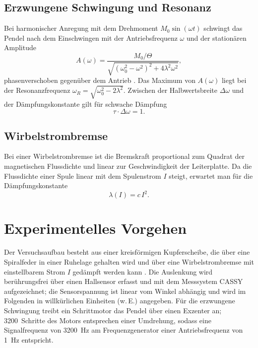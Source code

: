 \documentclass[11pt,a4paper]{article}
\begin{document}
\subsection{Erzwungene Schwingung und Resonanz}
Bei harmonischer Anregung mit dem Drehmoment $M_0\sin(\omega t)$
schwingt das Pendel nach dem Einschwingen mit der Antriebsfrequenz
$\omega$ und der stationären Amplitude
\begin{equation}
  A(\omega) = \frac{M_0/\Theta}
    {\sqrt{(\omega_0^2-\omega^2)^2 + 4\lambda^2\omega^2}},
  \label{eq:resonanz}
\end{equation}
phasenverschoben gegenüber dem Antrieb
\cite{Anleitung,Demtroeder}. Das Maximum von $A(\omega)$ liegt bei
der Resonanzfrequenz $\omega_R=\sqrt{\omega_0^2-2\lambda^2}$.
Zwischen der Halbwertsbreite $\Delta\omega$ und der
Dämpfungskonstante gilt für schwache Dämpfung
\begin{equation}
  \tau\cdot\Delta\omega = 1.
  \label{eq:tau_delta}
\end{equation}

\subsection{Wirbelstrombremse}
Bei einer Wirbelstrombremse ist die Bremskraft proportional zum
Quadrat der magnetischen Flussdichte und linear zur Geschwindigkeit
der Leiterplatte. Da die Flussdichte einer Spule linear mit dem
Spulenstrom $I$ steigt, erwartet man für die Dämpfungskonstante
\begin{equation}
  \lambda(I) = c\,I^2.
  \label{eq:lambda_I}
\end{equation}

\section{Experimentelles Vorgehen}
Der Versuchsaufbau besteht aus einer kreisförmigen Kupferscheibe,
die über eine Spiralfeder in einer Ruhelage gehalten wird und über
eine Wirbelstrombremse mit einstellbarem Strom $I$ gedämpft werden
kann \cite{Anleitung}. Die Auslenkung wird berührungsfrei über einen
Hallsensor erfasst und mit dem Messsystem CASSY aufgezeichnet; die
Sensorspannung ist linear vom Winkel abhängig und wird im Folgenden
in willkürlichen Einheiten (w.\,E.) angegeben. Für die erzwungene
Schwingung treibt ein Schrittmotor das Pendel über
einen Exzenter an; \num{3200}~Schritte des Motors entsprechen einer
Umdrehung, sodass eine Signalfrequenz von \SI{3200}{\hertz} am
Frequenzgenerator einer Antriebsfrequenz von \SI{1}{\hertz}
entspricht.
\end{document}

